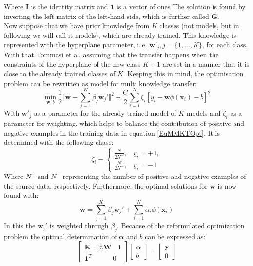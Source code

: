 Where $\mathbf{I}$ is the identity matrix and $\mathbf{1}$ is a vector of ones
The solution is found by inverting the left matrix of the left-hand side, which is further called $\mathbf{G}$.\cite{Tommasi.}\\
Now suppose that we have prior knowledge from $K$ classes (not models, but in following we will call it models), which are already trained.
This knowledge is represented with the hyperplane parameter, i.\,e. $\mathbf{w}'_j, j = \{1,\dots,K\}$, for each class.\cite{Tommasi.}\\
With that Tommasi et al. assuming that the transfer happens when the constraints of the hyperplane of the new class $K+1$ are set in a manner that it is close to the already trained classes of $K$.
Keeping this in mind, the optimisation problem can be rewritten as model for multi knowledge transfer:\cite{Tommasi.}
\begin{equation}\label{EqMMKTOpt}
		\min_{\mathbf{w},b} \frac{1}{2}\Vert\mathbf{w}-\sum_{j=1}^{K}\beta_j\mathbf{w}_j'\Vert^2 + \frac{C}{2}\sum_{i=1}^{N}\zeta_i[y_i-\mathbf{w}\phi(\mathbf{x}_i)-b]^2
\end{equation}
With $\mathbf{w}'_j$ as a parameter for the already trained model of $K$ models and $\zeta_i$ as a parameter for weighting, which helps to balance the contribution of positive and negative examples in the training data in equation \eqref{EqMMKTOpt}.
It is determined with the following chase:\cite{Tommasi.}
\begin{equation}\label{EqMMKTZeta}
	\zeta_i = \begin{cases}
			\frac{N}{2N^+}, \>\>\>\> y_i = +1,\\
			\frac{N}{2N^-}, \>\>\>\> y_i = -1
	\end{cases}
\end{equation} 
Where $N^+$ and $N^-$ representing the number of positive and negative examples of the source data, respectively.
Furthermore, the optimal solutions for $\mathbf{w}$ is now found with:\cite{Tommasi.}
\begin{equation}
	\mathbf{w} = \sum_{j=1}^{K}\beta_j\mathbf{w}_j'+\sum_{i=1}^{N}\alpha_i\phi(\mathbf{x}_i)
\end{equation}
In this the $\mathbf{w_j}'$ is weighted through $\beta_j$.
Because of the reformulated optimization problem the optimal determination of $\boldsymbol{\alpha}$ and $b$ can be expressed as:\cite{Tommasi.}
\begin{equation}\label{EqMMKTParaEst}
\begin{bmatrix}
\mathbf{K}+\frac{1}{C}\mathbf{W} \>\>\>\> \mathbf{1}\\
\mathbf{1}^T \>\>\>\>\>\>\>\>\>\>\>\>\>\> 0
\end{bmatrix}
\begin{bmatrix}
\boldsymbol{\alpha}\\
b
\end{bmatrix}
= 
\begin{bmatrix}
\mathbf{y} \\
0
\end{bmatrix}
\end{equation}
